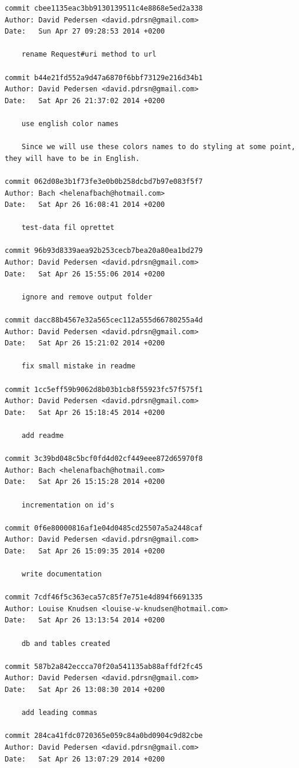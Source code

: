 \documentclass[12pt]{article}
\begin{document}
\begin{verbatim}
commit cbee1135eac3bb9130139511c4e8868e5ed2a338
Author: David Pedersen <david.pdrsn@gmail.com>
Date:   Sun Apr 27 09:28:53 2014 +0200

    rename Request#uri method to url

commit b44e21fd552a9d47a6870f6bbf73129e216d34b1
Author: David Pedersen <david.pdrsn@gmail.com>
Date:   Sat Apr 26 21:37:02 2014 +0200

    use english color names
    
    Since we will use these colors names to do styling at some point, they will have to be in English.

commit 062d08e3b1f73fe3e0b0b258dcbd7b97e083f5f7
Author: Bach <helenafbach@hotmail.com>
Date:   Sat Apr 26 16:08:41 2014 +0200

    test-data fil oprettet

commit 96b93d8339aea92b253cecb7bea20a80ea1bd279
Author: David Pedersen <david.pdrsn@gmail.com>
Date:   Sat Apr 26 15:55:06 2014 +0200

    ignore and remove output folder

commit dacc88b4567e32a565cec112a555d66780255a4d
Author: David Pedersen <david.pdrsn@gmail.com>
Date:   Sat Apr 26 15:21:02 2014 +0200

    fix small mistake in readme

commit 1cc5eff59b9062d8b03b1cb8f55923fc57f575f1
Author: David Pedersen <david.pdrsn@gmail.com>
Date:   Sat Apr 26 15:18:45 2014 +0200

    add readme

commit 3c39bd048c5bcf0fd4d02cf449eee872d65970f8
Author: Bach <helenafbach@hotmail.com>
Date:   Sat Apr 26 15:15:28 2014 +0200

    incrementation on id's

commit 0f6e80000816af1e04d0485cd25507a5a2448caf
Author: David Pedersen <david.pdrsn@gmail.com>
Date:   Sat Apr 26 15:09:35 2014 +0200

    write documentation

commit 7cdf46f5c363eca57c85f7e751e4d894f6691335
Author: Louise Knudsen <louise-w-knudsen@hotmail.com>
Date:   Sat Apr 26 13:13:54 2014 +0200

    db and tables created

commit 587b2a842eccca70f20a541135ab88affdf2fc45
Author: David Pedersen <david.pdrsn@gmail.com>
Date:   Sat Apr 26 13:08:30 2014 +0200

    add leading commas

commit 284ca41fdc0720365e059c84a0bd0904c9d82cbe
Author: David Pedersen <david.pdrsn@gmail.com>
Date:   Sat Apr 26 13:07:29 2014 +0200


\end{verbatim}
\end{document}
